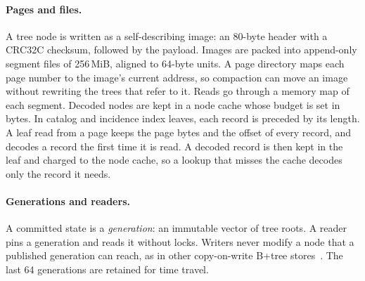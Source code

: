 \paragraph{Pages and files.} A tree node is written as a self-describing image: an 80-byte header with a CRC32C checksum, followed by the payload. Images are packed into append-only segment files of 256\,MiB, aligned to 64-byte units. A page directory maps each page number to the image's current address, so compaction can move an image without rewriting the trees that refer to it. Reads go through a memory map of each segment. Decoded nodes are kept in a node cache whose budget is set in bytes. In catalog and incidence index leaves, each record is preceded by its length. A leaf read from a page keeps the page bytes and the offset of every record, and decodes a record the first time it is read. A decoded record is then kept in the leaf and charged to the node cache, so a lookup that misses the cache decodes only the record it needs.

\paragraph{Generations and readers.} A committed state is a \emph{generation}: an immutable vector of tree roots. A reader pins a generation and reads it without locks. Writers never modify a node that a published generation can reach, as in other copy-on-write B+tree stores~\cite{lmdb}. The last 64 generations are retained for time travel.

